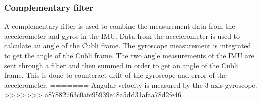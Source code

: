 \subsubsection{Complementary filter}
A complementary filter is used to combine the measurement data from the accelerometer and gyros in the IMU. 
Data from the accelerometer is used to calculate an angle of the Cubli frame.
The gyroscope measurement is integrated to get the angle of the Cubli frame.
The two angle measurements of the IMU are sent through a filter and then summed in order to get an angle of the Cubli frame.
This is done to counteract drift of the gyroscope and error of the accelerometer. 
=======
Angular velocity is measured by the 3-axis gyroscope. 
>>>>>>> a87882763c0afc95939e48a5dd31afaa78d2fe46
